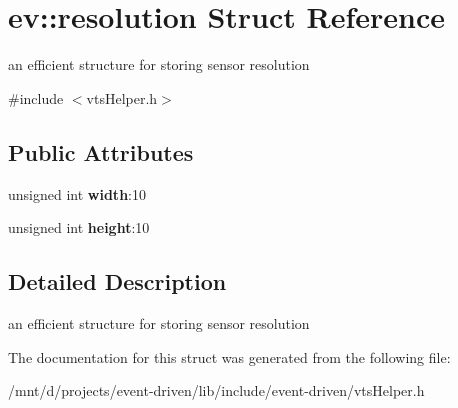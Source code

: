 \hypertarget{structev_1_1resolution}{}\section{ev\+:\+:resolution Struct Reference}
\label{structev_1_1resolution}


an efficient structure for storing sensor resolution  




{\ttfamily \#include $<$vts\+Helper.\+h$>$}

\subsection*{Public Attributes}
\begin{DoxyCompactItemize}
\item 
\mbox{\label{structev_1_1resolution_af63d9f023bf48b5170fbde6fac1fa60d}} 
unsigned int {\bfseries width}\+:10
\item 
\mbox{\label{structev_1_1resolution_ae9919e691ce05e1bbbf281dd79102ddb}} 
unsigned int {\bfseries height}\+:10
\end{DoxyCompactItemize}


\subsection{Detailed Description}
an efficient structure for storing sensor resolution 

The documentation for this struct was generated from the following file\+:\begin{DoxyCompactItemize}
\item 
/mnt/d/projects/event-\/driven/lib/include/event-\/driven/vts\+Helper.\+h\end{DoxyCompactItemize}
